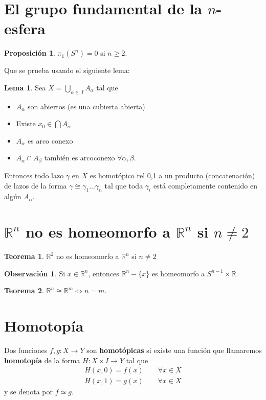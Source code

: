 \documentclass[spanish]{book}
\theoremstyle{definition}
\newtheorem*{lema}{Lema}
\newtheorem*{obs}{Observación}
\newtheorem*{teo}{Teorema}
\newtheorem*{prop}{Proposición}
\newcommand{\R}{\mathbb{R}}
\begin{document}
\section{El grupo fundamental de la $n$-esfera}
	\begin{prop}
		$\pi_1(S^n)=0$ si $n\geq2$.
	\end{prop}
	Que se prueba usando el siguiente lema:
	\begin{lema}\label{lema:homotopia}
		Sea $X=\bigcup_{\alpha\in\ I} A_\alpha$ tal que
		\begin{itemize}
			\item $A_\alpha$ son abiertos (es una cubierta abierta)
			\item Existe $x_0\in\bigcap A_\alpha$
			\item $A_\alpha$ es arco conexo
			\item $A_\alpha\cap A_\beta$ también es arcoconexo $\forall\alpha,\beta$.
		\end{itemize}
		Entonces  todo lazo $\gamma$ en $X$ es homotópico rel 0,1 a un producto (concatenación) de lazos de la forma $\gamma\cong\gamma_1...\gamma_n$
		tal que toda $\gamma_i$ está completamente contenido en algún $A_\alpha$.
	\end{lema}

\section{$\R^n$ no es homeomorfo a $\R^n$ si $n\neq2$}
	\begin{teo}
		$\R^2$ no es homeomorfo a $\R^n$ si $n\neq2$
	\end{teo}
	\begin{obs}
		Si $x\in\R^n$, entonces $\R^n-\{x\}$ es homeomorfo a $S^{n-1}\times\R$.
	\end{obs}
	\begin{teo}
		$\R^n\cong\R^m\iff n=m$.
	\end{teo}

\section{Homotopía}
\label{def:func-homot}
	Dos funciones $f,g:X\to Y$ son \textbf{homotópicas} si existe una función que llamaremos \textbf{homotopía} de la forma $H:X\times I\to Y$ tal que
	\begin{align*}
		H(x,0)=f(x)\qquad\forall x\in X\\
		H(x,1)=g(x)\qquad\forall x\in X
	\end{align*}
	y se denota por $f\simeq g$.
	
\end{document}

